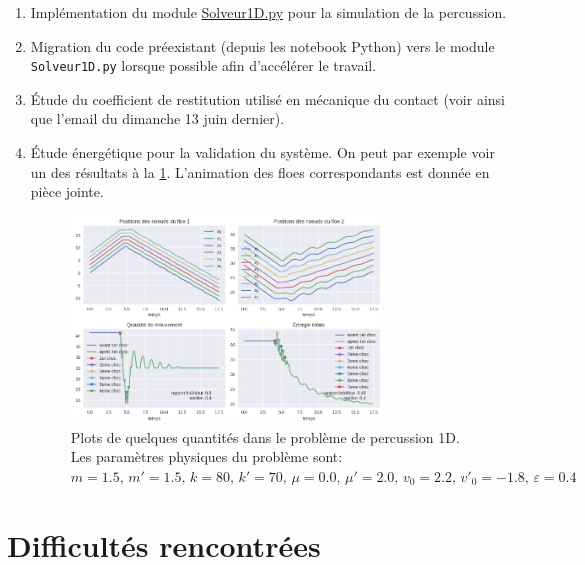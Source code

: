 \documentclass[
  french,
	11pt, %
]{fphw}
\begin{document}
\begin{enumerate}
  \item Implémentation du module \href{https://github.com/desmond-rn/ice-floes/blob/master/code/simu1D/Modules/Solveur1D.py}{Solveur1D.py} pour la simulation de la percussion.
  \item Migration du code préexistant (depuis les notebook Python) vers le module \texttt{Solveur1D.py} lorsque possible afin d'accélérer le travail.
  \item Étude du coefficient de restitution utilisé en mécanique du contact (voir \parencite[p.21]{acary2004coefficients} ainsi que l'email du dimanche 13 juin dernier).
  \item Étude énergétique pour la validation du système. On peut par exemple voir un des résultats à la \cref{fig:myfig}. L'animation des floes correspondants est donnée en pièce jointe.
  \begin{figure}[H]
    \centering
    \includegraphics[width=0.78\textwidth]{Plots1D.png}
    \caption{Plots de quelques quantités dans le problème de percussion 1D. Les paramètres physiques du problème sont: $m = 1.5, \, m' = 1.5,\, k = 80,\, k' = 70,\, \mu = 0.0,\, \mu' = 2.0,\, v_0 = 2.2,\, v'_0 = -1.8,\, \varepsilon  = 0.4$}
    \label{fig:myfig}
  \end{figure}
\end{enumerate}


 

\section*{Difficultés rencontrées}
\end{document}
